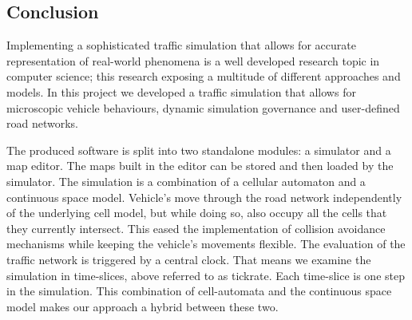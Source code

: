 \subsection*{Conclusion}
Implementing a sophisticated traffic simulation that allows for accurate representation of real-world phenomena is a well developed research topic in computer science; this research exposing a multitude of different approaches and models. In this project we developed a traffic simulation that allows for microscopic vehicle behaviours, dynamic simulation governance and user-defined road networks. 

The produced software is split into two standalone modules: a simulator and a map editor. The maps built in the editor can be stored and then loaded by the simulator. The simulation is a combination of a cellular automaton and a continuous space model. Vehicle's move through the road network independently of the underlying cell model, but while doing so, also occupy all the cells that they currently intersect. This eased the implementation of collision avoidance mechanisms while keeping the vehicle's movements flexible. The evaluation of the traffic network is triggered by a central clock. That means we examine the simulation in time-slices, above referred to as tickrate. Each time-slice is one step in the simulation. This combination of cell-automata and the continuous space model makes our approach a hybrid between these two.
\clearpage
